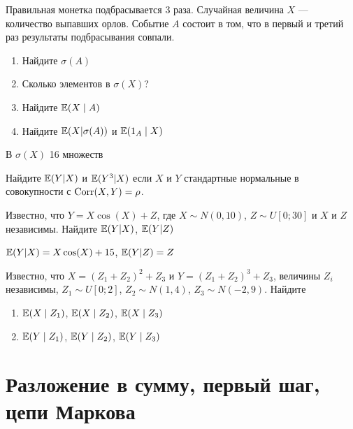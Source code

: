 \begin{problem}
 Правильная монетка подбрасывается 3 раза. Случайная величина $X$ — количество выпавших орлов. Событие $A$ состоит в том, что в первый и третий раз результаты подбрасывания совпали.
\begin{enumerate}
\item Найдите $\sigma(A)$
\item Сколько элементов в $\sigma(X)$?
\item Найдите $\mathbb{E}(X\mid A)$
\item Найдите $\mathbb{E}(X|\sigma(A))$ и $\mathbb{E}(1_A \mid X)$
\end{enumerate}

\begin{sol}
 В $\sigma(X)$ 16 множеств
\end{sol}
\end{problem}

\begin{problem}
Найдите $\mathbb{E}(Y|X)$ и $\mathbb{E}(Y^3|X)$ если $X$ и $Y$ стандартные нормальные в совокупности с $\operatorname{Corr}(X,Y)=\rho$.

\begin{sol}

\end{sol}
\end{problem}

\begin{problem}
Известно, что $Y=X\cos(X)+Z$, где $X\sim N(0,10)$, $Z\sim U[0;30]$ и $X$ и $Z$ независимы. Найдите $\mathbb{E}(Y|X)$, $\mathbb{E}(Y|Z)$

\begin{sol}
$\mathbb{E}(Y|X)=X\cos(X)+15$, $\mathbb{E}(Y|Z)=Z$
\end{sol}
\end{problem}

\begin{problem}
Известно, что $X=(Z_1+Z_2)^2+Z_3$ и $Y=(Z_1+Z_2)^3+Z_3$, величины $Z_i$ независимы, $Z_1\sim U[0;2]$, $Z_2\sim N(1,4)$, $Z_3\sim N(-2,9)$. Найдите
\begin{enumerate}
\item $\mathbb{E}(X \mid Z_1)$, $\mathbb{E}(X \mid Z_2)$, $\mathbb{E}(X \mid Z_3)$
\item $\mathbb{E}(Y \mid Z_1)$, $\mathbb{E}(Y \mid Z_2)$, $\mathbb{E}(Y \mid Z_3)$
\end{enumerate}


\begin{sol}
\end{sol}
\end{problem}


\section{Разложение в сумму, первый шаг, цепи Маркова}

